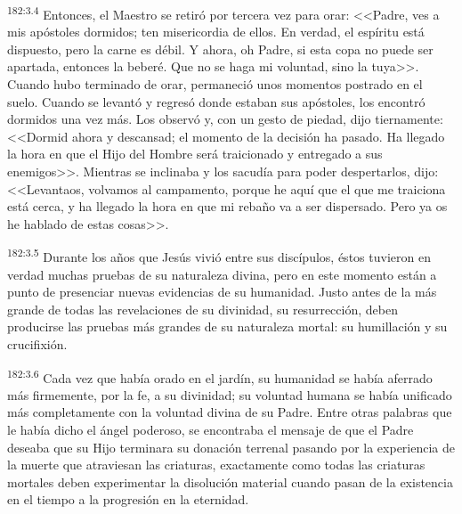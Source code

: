 \par 
\textsuperscript{182:3.4} Entonces, el Maestro se retiró por tercera vez para orar: <<Padre, ves a mis apóstoles dormidos; ten misericordia de ellos. En verdad, el espíritu está dispuesto, pero la carne es débil. Y ahora, oh Padre, si esta copa no puede ser apartada, entonces la beberé. Que no se haga mi voluntad, sino la tuya>>. Cuando hubo terminado de orar, permaneció unos momentos postrado en el suelo. Cuando se levantó y regresó donde estaban sus apóstoles, los encontró dormidos una vez más. Los observó y, con un gesto de piedad, dijo tiernamente: <<Dormid ahora y descansad; el momento de la decisión ha pasado. Ha llegado la hora en que el Hijo del Hombre será traicionado y entregado a sus enemigos>>. Mientras se inclinaba y los sacudía para poder despertarlos, dijo: <<Levantaos, volvamos al campamento, porque he aquí que el que me traiciona está cerca, y ha llegado la hora en que mi rebaño va a ser dispersado. Pero ya os he hablado de estas cosas>>.

\par 
\textsuperscript{182:3.5} Durante los años que Jesús vivió entre sus discípulos, éstos tuvieron en verdad muchas pruebas de su naturaleza divina, pero en este momento están a punto de presenciar nuevas evidencias de su humanidad. Justo antes de la más grande de todas las revelaciones de su divinidad, su resurrección, deben producirse las pruebas más grandes de su naturaleza mortal: su humillación y su crucifixión.

\par 
\textsuperscript{182:3.6} Cada vez que había orado en el jardín, su humanidad se había aferrado más firmemente, por la fe, a su divinidad; su voluntad humana se había unificado más completamente con la voluntad divina de su Padre. Entre otras palabras que le había dicho el ángel poderoso, se encontraba el mensaje de que el Padre deseaba que su Hijo terminara su donación terrenal pasando por la experiencia de la muerte que atraviesan las criaturas, exactamente como todas las criaturas mortales deben experimentar la disolución material cuando pasan de la existencia en el tiempo a la progresión en la eternidad.

